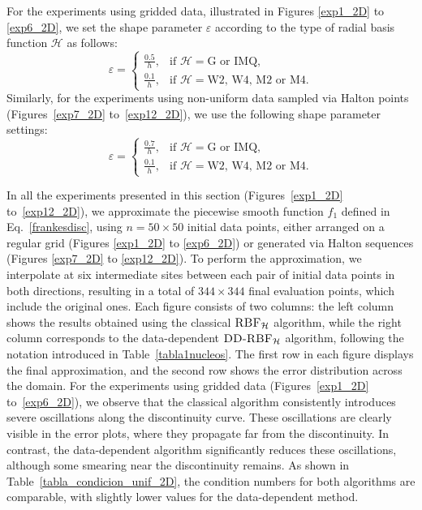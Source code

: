 \documentclass[preprint]{elsarticle}       %
\begin{document}
For the experiments using gridded data, illustrated in Figures \ref{exp1_2D} to \ref{exp6_2D}, we set the shape parameter $\varepsilon$ according to the type of radial basis function $\mathcal{H}$ as follows:
\[
\varepsilon = 
\begin{cases}
\frac{0.5}{h}, & \text{if } \mathcal{H} = \text{G or IMQ}, \\
\frac{0.1}{h}, & \text{if } \mathcal{H} = \text{W2, W4, M2 or M4}.
\end{cases}
\]
Similarly, for the experiments using non-uniform data sampled via Halton points (Figures~\ref{exp7_2D} to~\ref{exp12_2D}), we use the following shape parameter settings:
\[
\varepsilon = 
\begin{cases}
\frac{0.7}{h}, & \text{if } \mathcal{H} = \text{G or IMQ}, \\
\frac{0.1}{h}, & \text{if } \mathcal{H} = \text{W2, W4, M2 or M4}.
\end{cases}
\]


In all the experiments presented in this section (Figures~\ref{exp1_2D} to~\ref{exp12_2D}), we approximate the piecewise smooth function $f_1$ defined in Eq.~\eqref{frankesdisc}, using $n = 50 \times 50$ initial data points, either arranged on a regular grid (Figures \ref{exp1_2D} to \ref{exp6_2D}) or generated via Halton sequences (Figures \ref{exp7_2D} to \ref{exp12_2D}). To perform the approximation, we interpolate at six intermediate sites between each pair of initial data points in both directions, resulting in a total of $344 \times 344$ final evaluation points, which include the original ones. Each figure consists of two columns: the left column shows the results obtained using the classical $\textsc{RBF}_{\mathcal{H}}$ algorithm, while the right column corresponds to the data-dependent $\textsc{DD-RBF}_{\mathcal{H}}$ algorithm, following the notation introduced in Table~\ref{tabla1nucleos}. The first row in each figure displays the final approximation, and the second row shows the error distribution across the domain. For the experiments using gridded data (Figures~\ref{exp1_2D} to~\ref{exp6_2D}), we observe that the classical algorithm consistently introduces severe oscillations along the discontinuity curve. These oscillations are clearly visible in the error plots, where they propagate far from the discontinuity. In contrast, the data-dependent algorithm significantly reduces these oscillations, although some smearing near the discontinuity remains. As shown in Table~\ref{tabla_condicion_unif_2D}, the condition numbers for both algorithms are comparable, with slightly lower values for the data-dependent method.
\end{document}
